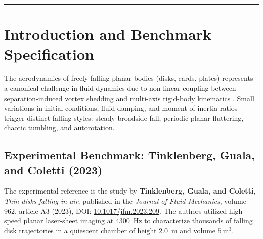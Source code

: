 \documentclass[11pt,a4paper]{article}
\begin{document}
\begin{abstract}
\medskip
\noindent Validation against the experimental mean terminal settling speed is partial: the simulated asymptotic velocity ($V_\infty \approx 1.02$~m/s) exhibits a $-17.1\%$ deficit relative to the experimental mean ($V_t = 1.23$~m/s). Direct 6DoF sensitivity tests bound mesh sensitivity at $-0.09\%$, time-step sensitivity at $+0.04\%$, and convection scheme sensitivity at $-0.75\%$ (each $\lesssim 1\%$; these are single-pair shifts, not a formal GCI). Specimen thickness scatter alone cannot explain the deficit (accounting for $-17\%$ speed solely via thickness would require about $-31\%$ mean thickness, $\approx 35\ \mu\text{m}$ vs.\ $50\ \mu\text{m}$); the cause of the $-17\%$ deficit remains unidentified and unresolved. Under ASME V\&V 20 guidelines, comparison error ($|E| = 0.206$~m/s) significantly exceeds the validation uncertainty of the mean ($u_{\mathrm{val}} \approx 0.018$~m/s). The simulation is \textbf{not validated} for mean terminal settling velocity within validation uncertainty.
\end{abstract}

\vspace{4mm}
\hrule
\vspace{4mm}

\tableofcontents

\newpage

\section{Introduction and Benchmark Specification}

The aerodynamics of freely falling planar bodies (disks, cards, plates) represents a canonical challenge in fluid dynamics due to non-linear coupling between separation-induced vortex shedding and multi-axis rigid-body kinematics \cite{varshney2012}. Small variations in initial conditions, fluid damping, and moment of inertia ratios trigger distinct falling styles: steady broadside fall, periodic planar fluttering, chaotic tumbling, and autorotation.

\subsection{Experimental Benchmark: Tinklenberg, Guala, and Coletti (2023)}
The experimental reference is the study by \textbf{Tinklenberg, Guala, and Coletti}, \emph{Thin disks falling in air}, published in the \emph{Journal of Fluid Mechanics}, volume 962, article A3 (2023), DOI: \href{https://doi.org/10.1017/jfm.2023.209}{10.1017/jfm.2023.209}. The authors utilized high-speed planar laser-sheet imaging at $4300$~Hz to characterize thousands of falling disk trajectories in a quiescent chamber of height $2.0$~m and volume $5\ \mathrm{m}^3$.
\end{document}
